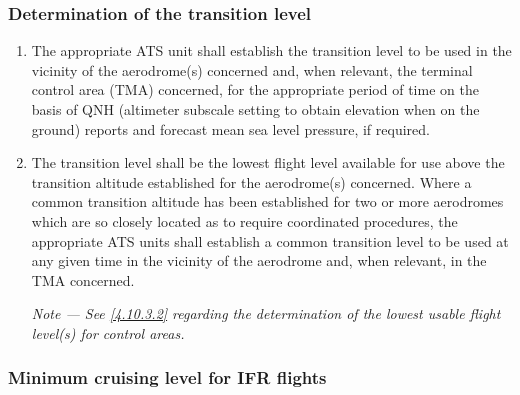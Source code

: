 \documentclass[../main.tex]{subfiles}
\begin{document}
    \subsubsection{Determination of the transition level}

    \begin{enumerate}
        \item The appropriate ATS unit shall establish the transition level to be used in the vicinity of the aerodrome(s) concerned and, when relevant, the terminal control area (TMA) concerned, for the appropriate period of time on the basis of QNH (altimeter subscale setting to obtain elevation when on the ground) reports and forecast mean sea level pressure, if required.
        \item The transition level shall be the lowest flight level available for use above the transition altitude established for the aerodrome(s) concerned. Where a common transition altitude has been established for two or more aerodromes which are so closely located as to require coordinated procedures, the appropriate ATS units shall establish a common transition level to be used at any given time in the vicinity of the aerodrome and, when relevant, in the TMA concerned.

        \textit{Note --- See \ref{4.10.3.2} regarding the determination of the lowest usable flight level(s) for control areas.}
    \end{enumerate}

    \subsubsection{Minimum cruising level for IFR flights}
\end{document}

